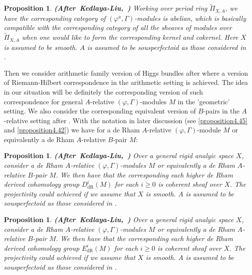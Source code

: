 \documentclass[12pt]{amsart}
\newtheorem{proposition}[theorem]{Proposition}
\theoremstyle{definition}
\numberwithin{equation}{section}
\begin{document}
\begin{proposition} \mbox{\bf{(After Kedlaya-Liu, \cite[Theorem 8.10.6]{KL16})}} 
Working over period ring $\widetilde{\Pi}_{X,A}$, we have the corresponding category of $(\varphi^a,\Gamma)$-modules is abelian, which is basically compatible with the corresponding category of all the sheaves of modules over $\widetilde{\Pi}_{X,A}$ when one would like to form the corresponding kernel and cokernel. Here $X$ is assumed to be smooth. $A$ is assumed to be sousperfectoid as those considered in \cite{KH}.\\
\end{proposition}


\indent Then we consider arithmetic family version of Higgs bundles after \cite{LZ} where a version of Riemann-Hilbert correspondence in the arithmetic setting is achieved. The idea in our situation will be definitely the corresponding version of such correspondence for general $A$-relative $(\varphi,\Gamma)$-modules $M$ in the 'geometric' setting. We also consider the corresponding equivalent version of $B$-pairs in the $A$-relative setting after \cite{KL16}. With the notation in later discussion (see \cref{proposition4.45} and \cref{proposition4.42}) we have for a de Rham $A$-relative $(\varphi,\Gamma)$-module $M$ or equivalently a de Rham $A$-relative $B$-pair $M$:


\begin{proposition} \mbox{\bf{(After Kedlaya-Liu, \cite[below Definition 10.10]{KL3})}}
Over a general rigid analyic space $X$, consider a de Rham $A$-relative $(\varphi,\Gamma)$-modules $M$ or equivalently a de Rham $A$-relative $B$-pair $M$. We then have that the corresponding each higher de Rham derived cohomology group $D^i_\mathrm{dR}(M)$ for each $i\geq 0$ is coherent sheaf over $X$. The projectivity could achieved if we assume that $X$ is smooth. $A$ is assumed to be sousperfectoid as those considered in \cite{KH}.


\end{proposition}

\begin{proposition} \mbox{\bf{(After Kedlaya-Liu, \cite[below Definition 10.10]{KL3})}}
Over a general rigid analyic space $X$, consider a de Rham $A$-relative $(\varphi,\Gamma)$-modules $M$ or equivalently a de Rham $A$-relative $B$-pair $M$. We then have that the corresponding each higher de Rham derived cohomology group $E^i_\mathrm{dR}(M)$ for each $i\geq 0$ is coherent sheaf over $X$. The projectivity could achieved if we assume that $X$ is smooth. $A$ is assumed to be sousperfectoid as those considered in \cite{KH}.\\


\end{proposition}
\end{document}
